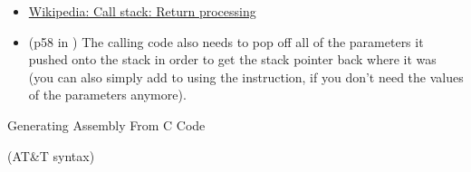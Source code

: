 \begin{itemize}
\item \href{http://en.wikipedia.org/wiki/Call_stack#Return_processing}{Wikipedia: Call
    stack: Return processing}
\item (p58 in \cite{bartlett2009programming}) The calling code also needs to pop off all
  of the parameters it pushed onto the stack in order to get the stack pointer back where
  it was (you can also simply add  to  using
  the  instruction, if you don't need the values of the parameters anymore).
\end{itemize}

\begin{frame}{Generating Assembly From C Code}
  \begin{minipage}{.22\linewidth}
    \begin{block}{}
       
    \end{block}
    \begin{small}
      \begin{center}
      \end{center}
    \end{small}
  \end{minipage}\qquad
  \begin{minipage}{.7\linewidth}
    \begin{block}{ \scriptsize{(AT\&T syntax)}}
       
    \end{block}
  \end{minipage}
\end{frame}


